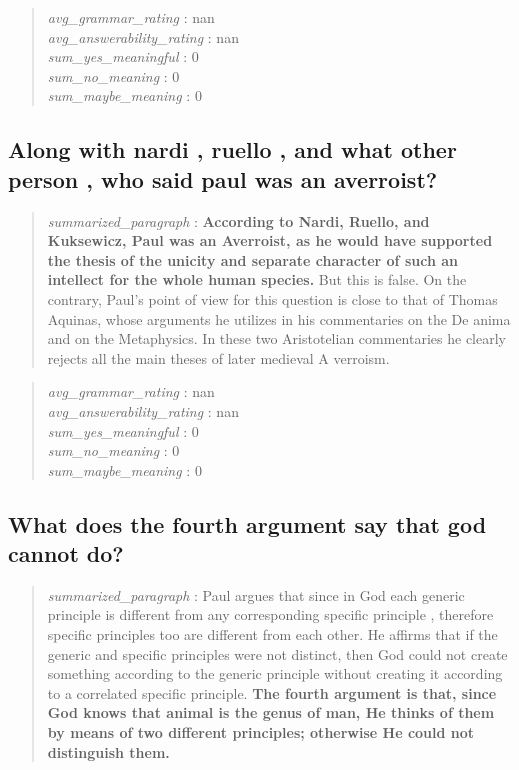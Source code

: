 \begin{quote}
\emph{avg\_grammar\_rating} : nan\\
\emph{avg\_answerability\_rating} : nan\\
\emph{sum\_yes\_meaningful} : 0\\
\emph{sum\_no\_meaning} : 0\\
\emph{sum\_maybe\_meaning} : 0
\end{quote}

\hypertarget{along-with-nardi-ruello-and-what-other-person-who-said-paul-was-an-averroist}{%
\subsection{Along with nardi , ruello , and what other person , who said
paul was an
averroist?}\label{along-with-nardi-ruello-and-what-other-person-who-said-paul-was-an-averroist}}

\begin{quote}
\emph{summarized\_paragraph} : \textbf{According to Nardi, Ruello, and
Kuksewicz, Paul was an Averroist, as he would have supported the thesis
of the unicity and separate character of such an intellect for the whole
human species.} But this is false. On the contrary, Paul's point of view
for this question is close to that of Thomas Aquinas, whose arguments he
utilizes in his commentaries on the De anima and on the Metaphysics. In
these two Aristotelian commentaries he clearly rejects all the main
theses of later medieval A verroism.
\end{quote}

\begin{quote}
\emph{avg\_grammar\_rating} : nan\\
\emph{avg\_answerability\_rating} : nan\\
\emph{sum\_yes\_meaningful} : 0\\
\emph{sum\_no\_meaning} : 0\\
\emph{sum\_maybe\_meaning} : 0
\end{quote}

\hypertarget{what-does-the-fourth-argument-say-that-god-cannot-do}{%
\subsection{What does the fourth argument say that god cannot
do?}\label{what-does-the-fourth-argument-say-that-god-cannot-do}}

\begin{quote}
\emph{summarized\_paragraph} : Paul argues that since in God each
generic principle is different from any corresponding specific principle
, therefore specific principles too are different from each other. He
affirms that if the generic and specific principles were not distinct,
then God could not create something according to the generic principle
without creating it according to a correlated specific principle.
\textbf{The fourth argument is that, since God knows that animal is the
genus of man, He thinks of them by means of two different principles;
otherwise He could not distinguish them.}
\end{quote}


